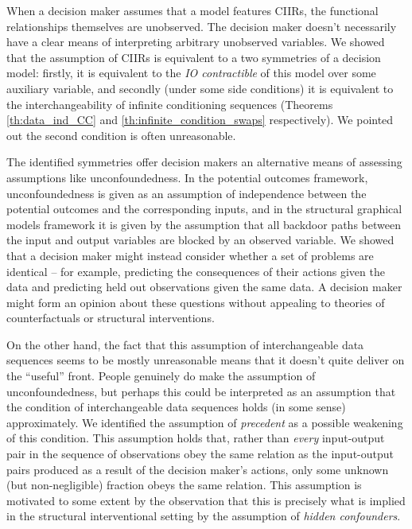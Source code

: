 When a decision maker assumes that a model features CIIRs, the functional relationships themselves are unobserved. The decision maker doesn't necessarily have a clear means of interpreting arbitrary unobserved variables. We showed that the assumption of CIIRs is equivalent to a two symmetries of a decision model: firstly, it is equivalent to the \emph{IO contractible} of this model over some auxiliary variable, and secondly (under some side conditions) it is equivalent to the interchangeability of infinite conditioning sequences (Theorems \ref{th:data_ind_CC} and \ref{th:infinite_condition_swaps} respectively). We pointed out the second condition is often unreasonable.

The identified symmetries offer decision makers an alternative means of assessing assumptions like unconfoundedness. In the potential outcomes framework, unconfoundedness is given as an assumption of independence between the potential outcomes and the corresponding inputs, and in the structural graphical models framework it is given by the assumption that all backdoor paths between the input and output variables are blocked by an observed variable. We showed that a decision maker might instead consider whether a set of problems are identical -- for example, predicting the consequences of their actions given the data and predicting held out observations given the same data. A decision maker might form an opinion about these questions without appealing to theories of counterfactuals or structural interventions.

On the other hand, the fact that this assumption of interchangeable data sequences seems to be mostly unreasonable means that it doesn't quite deliver on the ``useful'' front. People genuinely do make the assumption of unconfoundedness, but perhaps this could be interpreted as an assumption that the condition of interchangeable data sequences holds (in some sense) approximately. We identified the assumption of \emph{precedent} as a possible weakening of this condition. This assumption holds that, rather than \emph{every} input-output pair in the sequence of observations obey the same relation as the input-output pairs produced as a result of the decision maker's actions, only some unknown (but non-negligible) fraction obeys the same relation. This assumption is motivated to some extent by the observation that this is precisely what is implied in the structural interventional setting by the assumption of \emph{hidden confounders}.

